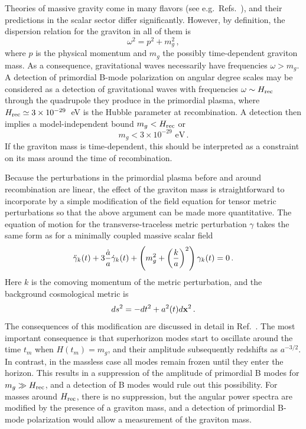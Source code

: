 Theories of massive gravity come in many flavors (see e.g.\ Refs.~\cite{Dubovsky:2004sg,Hinterbichler:2011tt}), and their predictions in the scalar sector differ significantly. However, by definition, the dispersion relation for the graviton in all of them is
\begin{equation}
\omega^2=p^2+m_g^2\,,
\end{equation}
where $p$ is the physical momentum and $m_g$ the possibly time-dependent graviton mass. As a consequence, gravitational waves necessarily have frequencies $\omega>m_g$. A detection of primordial B-mode polarization on angular degree scales may be considered as a detection of gravitational waves with frequencies $\omega\sim H_{\rm rec}$ through the quadrupole they produce in the primordial plasma, where $H_{\rm rec}\simeq 3\times 10^{-29}$~eV is the Hubble parameter at recombination. A detection then implies a model-independent bound $m_g<H_{\rm rec}$ or 
\begin{equation}
m_g< 3\times 10^{-29}{\mbox{ eV}}\,.
\end{equation}
If the graviton mass is time-dependent, this should be interpreted as a constraint on its mass around the time of recombination.

Because the perturbations in the primordial plasma before and around recombination are linear, the effect of the graviton mass is straightforward to incorporate by a simple modification of the field equation for tensor metric perturbations so that the above argument can be made more quantitative. The equation of motion for the transverse-traceless metric perturbation $\gamma$ takes the same form as for a minimally coupled massive scalar field
\begin{equation}
\label{massive}
\ddot{\gamma}_k(t)+3{\dot a\over a} \dot{\gamma}_k(t)+\left(m_g^2+\left(\frac{k}{a}\right)^2\right) \gamma_k(t)=0\,.
\end{equation}
Here $k$ is the comoving momentum of the metric perturbation, and the background cosmological metric is
\begin{equation}
ds^2= -dt^2+a^2(t)d{\bf x}^2\,.
\end{equation}
The consequences of this modification are discussed in detail in Ref.~\cite{Dubovsky:2009xk}. The most important consequence is that superhorizon modes start to oscillate around the time $t_m$ when $H(t_m)=m_g$, and their amplitude subsequently redshifts as $a^{-3/2}$. In contrast, in the massless case all modes remain frozen until they enter the horizon. This results in a suppression of the amplitude of primordial B modes for $m_g\gg H_{\rm rec}$, and a detection of B modes would rule out this possibility. For masses around $H_{\rm rec}$, there is no suppression, but the angular power spectra are modified by the presence of a graviton mass, and a detection of primordial B-mode polarization would allow a measurement of the graviton mass. 
 
